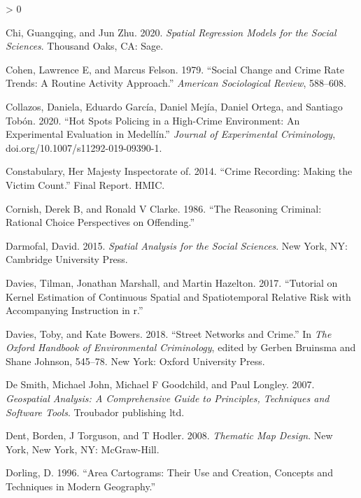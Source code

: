 \documentclass[
  krantz2]{krantz}
\newlength{\cslhangindent}
\newenvironment{CSLReferences}[2] %
 {%
  \setlength{\parindent}{0pt}
  \ifodd #1 \everypar{\setlength{\hangindent}{\cslhangindent}}\ignorespaces\fi
  \ifnum #2 > 0
  \setlength{\parskip}{#2\baselineskip}
  \fi
 }%
 {}
\begin{document}
\begin{CSLReferences}{1}{0}
\leavevmode\hypertarget{ref-Chi_2020}{}%
Chi, Guangqing, and Jun Zhu. 2020. \emph{Spatial Regression Models for the Social Sciences}. Thousand Oaks, CA: Sage.

\leavevmode\hypertarget{ref-Cohen_1979}{}%
Cohen, Lawrence E, and Marcus Felson. 1979. {``Social Change and Crime Rate Trends: A Routine Activity Approach.''} \emph{American Sociological Review}, 588--608.

\leavevmode\hypertarget{ref-Collazos_2020}{}%
Collazos, Daniela, Eduardo García, Daniel Mejía, Daniel Ortega, and Santiago Tobón. 2020. {``Hot Spots Policing in a High-Crime Environment: An Experimental Evaluation in Medellín.''} \emph{Journal of Experimental Criminology}, doi.org/10.1007/s11292-019-09390-1.

\leavevmode\hypertarget{ref-HMIC_2014}{}%
Constabulary, Her Majesty Inspectorate of. 2014. {``Crime Recording: Making the Victim Count.''} Final Report. HMIC.

\leavevmode\hypertarget{ref-Cornish_1986}{}%
Cornish, Derek B, and Ronald V Clarke. 1986. {``The Reasoning Criminal: Rational Choice Perspectives on Offending.''}

\leavevmode\hypertarget{ref-Darmofal_2015}{}%
Darmofal, David. 2015. \emph{Spatial Analysis for the Social Sciences}. New York, NY: Cambridge University Press.

\leavevmode\hypertarget{ref-Davies_2017}{}%
Davies, Tilman, Jonathan Marshall, and Martin Hazelton. 2017. {``Tutorial on Kernel Estimation of Continuous Spatial and Spatiotemporal Relative Risk with Accompanying Instruction in r.''}

\leavevmode\hypertarget{ref-Davies_2018}{}%
Davies, Toby, and Kate Bowers. 2018. {``Street Networks and Crime.''} In \emph{The Oxford Handbook of Environmental Criminology}, edited by Gerben Bruinsma and Shane Johnson, 545--78. New York: Oxford University Press.

\leavevmode\hypertarget{ref-DeSmith_2007}{}%
De Smith, Michael John, Michael F Goodchild, and Paul Longley. 2007. \emph{Geospatial Analysis: A Comprehensive Guide to Principles, Techniques and Software Tools}. Troubador publishing ltd.

\leavevmode\hypertarget{ref-Dent_2008}{}%
Dent, Borden, J Torguson, and T Hodler. 2008. \emph{Thematic Map Design}. New York, New York, NY: McGraw-Hill.

\leavevmode\hypertarget{ref-Dorling_1996}{}%
Dorling, D. 1996. {``Area Cartograms: Their Use and Creation, Concepts and Techniques in Modern Geography.''}


\end{CSLReferences}
\end{document}

